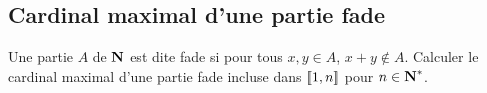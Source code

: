 \subsection{Cardinal maximal d'une partie fade}
\begin{exercice}
    Une partie $A$ de $\operatorname{\mathbf{N}}$ est dite fade si pour tous $x,y\in A$, $x+y\notin A$.
    Calculer le cardinal maximal d'une partie fade incluse dans $[\![1,n]\!]$ pour $n\in\operatorname{\mathbf{N}}^*$.
\end{exercice}

\begin{correction}


\end{correction}

